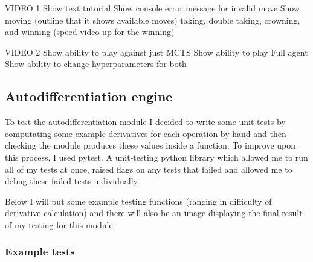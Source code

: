 \documentclass{article}
\begin{document}
    VIDEO 1
    Show text tutorial
    Show console error message for invalid move
    Show moving (outline that it shows available moves)
    taking, double taking, crowning, and winning (speed video up for the winning)
    
    VIDEO 2
    Show ability to play against just MCTS
    Show ability to play Full agent
    Show ability to change hyperparameters for both

    \subsection{Autodifferentiation engine}

    To test the autodifferentiation module I decided to write some unit tests by computating some example
    derivatives for each operation by hand and then checking the module produces these values inside a function.
    To improve upon this process, I used pytest. A unit-testing python library which allowed me to run all of my tests
    at once, raised flags on any tests that failed and allowed me to debug these failed tests individually.

    Below I will put some example testing functions (ranging in difficulty of derivative calculation) and there will
    also be an image displaying the final result of my testing for this module.

    \subsubsection{Example tests}
\end{document}
